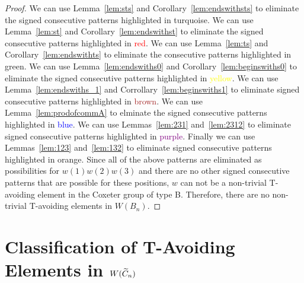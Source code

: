 \begin{proof}
We can use Lemma~\ref{lem:sts} and Corollary~\ref{lem:endswithsts} to eliminate the signed consecutive patterns highlighted in \textcolor{turq}{turquoise}. We can use Lemma~\ref{lem:st} and Corollary~\ref{lem:endswithst} to eliminate the signed consecutive patterns highlighted in \textcolor{red}{red}. We can use Lemma~\ref{lem:ts} and Corollary~\ref{lem:endswithts} to eliminate the consecutive patterns highlighted in \textcolor{ggreen}{green}.  We can use Lemma~\ref{lem:endswiths0} and Corollary~\ref{lem:beginswiths0} to eliminate the signed consecutive patterns highlighted in \textcolor{yellow}{yellow}. We can use Lemma~\ref{lem:endswiths_1} and Corrollary~\ref{lem:beginswiths1} to eliminate signed consecutive patterns highlighted in \textcolor{brown}{brown}. We can use Lemma~\ref{lem:prodofcommA} to elminate the signed consecutive patterns highlighted in \textcolor{blue}{blue}. We can use Lemmas~\ref{lem:231} and~\ref{lem:2312} to eliminate signed consecutive patterns highlighted in \textcolor{purple}{purple}. Finally we can use Lemmas~\ref{lem:123} and~\ref{lem:132} to eliminate signed consecutive patterns highlighted in \textcolor{orange2}{orange}. Since all of the above patterns are eliminated as possibilities for $w(1)w(2)w(3)$ and there are no other signed consecutive patterns that are possible for these positions, $w$ can not be a non-trivial T-avoiding element in the Coxeter group of type B. Therefore, there are no non-trivial T-avoiding elements in $W(B_n)$.
\end{proof}

\section{Classification of T-Avoiding Elements in $W(\widetilde{C}_n)$}
